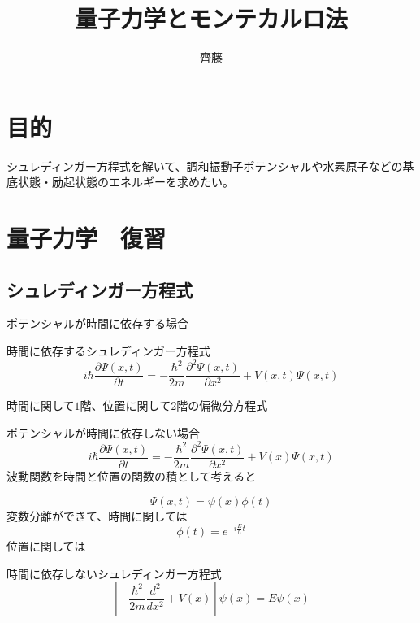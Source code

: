 \documentclass[dvipdfmx]{beamer}
\title{量子力学とモンテカルロ法}
\author{齊藤}
\begin{document}
\maketitle
\frame{\tableofcontents[hideallsubsections]}

\section{目的}
\begin{frame}
    シュレディンガー方程式を解いて、調和振動子ポテンシャルや水素原子などの基底状態・励起状態のエネルギーを求めたい。

\end{frame}


\section{量子力学　復習}
\subsection{シュレディンガー方程式}
\begin{frame}{\insertsubsection}
    ポテンシャルが時間に依存する場合
    \begin{block}{時間に依存するシュレディンガー方程式}
        \begin{equation}
            i\hbar\dfrac{\partial \Psi(x,t)}{\partial t} = -\dfrac{\hbar^2}{2m}\dfrac{\partial^2 \Psi(x,t)}{\partial x^2} + V(x,t)\Psi(x,t)
        \end{equation}
    \end{block}

    時間に関して$1$階、位置に関して$2$階の偏微分方程式
    \end{frame}

    \begin{frame}
    ポテンシャルが時間に依存しない場合
        \begin{equation}
            i\hbar\dfrac{\partial \Psi(x,t)}{\partial t} = -\dfrac{\hbar^2}{2m}\dfrac{\partial^2 \Psi(x,t)}{\partial x^2} + V(x)\Psi(x,t)
        \end{equation}
    波動関数を時間と位置の関数の積として考えると

        \begin{equation}
            \Psi(x,t) = \psi(x)\phi(t)
        \end{equation}
    変数分離ができて、時間に関しては
        \begin{equation}
            \phi(t) = e^{-i\frac{E}{\hbar}t}
        \end{equation}
    位置に関しては
    \begin{block}{時間に依存しないシュレディンガー方程式}
        \begin{equation}
            \left[-\dfrac{\hbar^2}{2m}\dfrac{d^2}{dx^2} + V(x)\right]\psi(x) = E\psi(x)
        \end{equation}
    \end{block}
    \end{frame}
\end{document}
